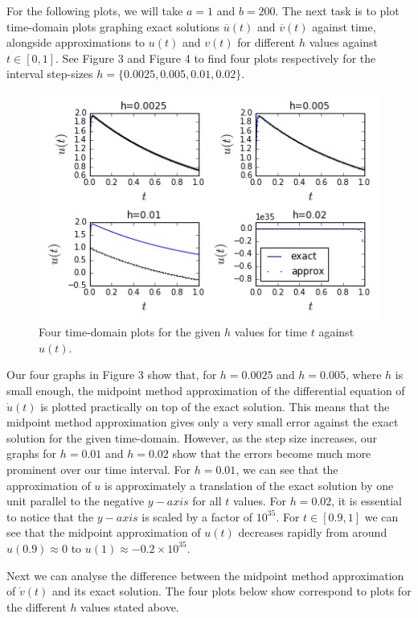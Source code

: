 \documentclass[11pt,a4paper]{article}
\begin{document}
For the following plots, we will take $a=1$ and $b=200$.
The next task is to plot time-domain plots graphing exact solutions $\overline{u}(t)$ and $\overline{v}(t)$ against time, alongside approximations to $u(t)$ and $v(t)$ for different $h$ values against $t\in[0,1]$. See Figure 3 and Figure 4 to find four plots respectively for the interval step-sizes $h=\{0.0025,0.005,0.01,0.02\}$.

\begin{figure}[h]
\caption{Four time-domain plots for the given $h$ values for time $t$ against $u(t)$.}
\includegraphics[scale=0.8]{t_ut_sub.jpg}
\centering
\end{figure}

Our four graphs in Figure 3 show that, for $h=0.0025$ and $h=0.005$, where $h$ is small enough, the midpoint method approximation of the differential equation of $\dot{u}(t)$ is plotted practically on top of the exact solution. This means that the midpoint method approximation gives only a very small error against the exact solution for the given time-domain. However, as the step size increases, our graphs for $h=0.01$ and $h=0.02$ show that the errors become much more prominent over our time interval. For $h=0.01$, we can see that the approximation of $u$ is approximately a translation of the exact solution by one unit parallel to the negative $y-axis$ for all $t$ values. For $h=0.02$, it is essential to notice that the $y-axis$ is scaled by a factor of $10^{35}$. For $t\in[0.9,1]$ we can see that the midpoint approximation of $u(t)$ decreases rapidly from around $u(0.9)\approx 0$ to $u(1)\approx {-0.2}\times 10^{35}$.

Next we can analyse the difference between the midpoint method approximation of $\dot{v}(t)$ and its exact solution. The four plots below show correspond to plots for the different $h$ values stated above.
\end{document}
